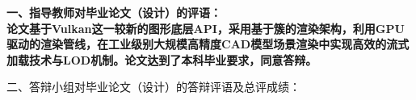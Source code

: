 \cleardoublepage{}

{
    \bfseries
    \noindent 一、指导教师对毕业论文（设计）的评语：\\

    \mdseries
    \noindent 	
    论文基于Vulkan这一较新的图形底层API，采用基于簇的渲染架构，利用GPU驱动的渲染管线，在工业级别大规模高精度CAD模型场景渲染中实现高效的流式加载技术与LOD机制。论文达到了本科毕业要求，同意答辩。

    \bfseries
    \signature{指导教师（签名）}

    \noindent 二、答辩小组对毕业论文（设计）的答辩评语及总评成绩：\\

    \mbox{} \vfill

    \finaleval[][][][][]

    \signature{负责人（签名）}
}
